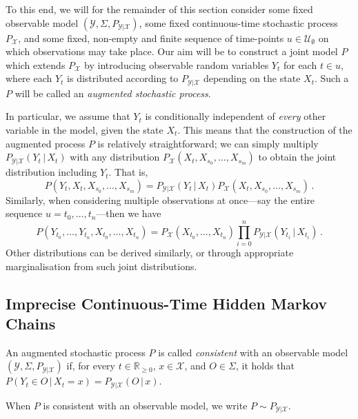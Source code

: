 \documentclass[twoside,11pt]{article}
\newcommand{\reals}{\mathbb{R}}
\newcommand{\realsnonneg}{\reals_{\geq 0}}
\newcommand{\states}{\mathcal{X}}
\newcommand{\observs}{\mathcal{Y}}
\begin{document}
To this end, we will for the remainder of this section consider some fixed observable model $(\observs,\Sigma,P_{\observs\vert\states})$, some fixed continuous-time stochastic process $P_\states$, and some fixed, non-empty and finite sequence of time-points $u\in\mathcal{U}_{\emptyset}$ on which observations may take place. Our aim will be to construct a joint model $P$ which extends $P_\states$ by introducing observable random variables $Y_t$ for each $t\in u$, where each $Y_t$ is distributed according to $P_{\observs\vert\states}$ depending on the state $X_t$. Such a $P$ will be called an \emph{augmented stochastic process}.

In particular, we assume that $Y_t$ is conditionally independent of \emph{every} other variable in the model, given the state $X_t$. This means that the construction of the augmented process $P$ is relatively straightforward; we can simply multiply $P_{\observs\vert\states}(Y_t\,\vert\,X_t)$ with any distribution $P_\states(X_t,X_{s_0},\ldots,X_{s_m})$ to obtain the joint distribution including $Y_t$. That is,
\begin{equation*}
P(Y_t,X_t,X_{s_0},\ldots,X_{s_m}) = P_{\observs\vert\states}(Y_t\,\vert\,X_t)P_\states(X_t,X_{s_0},\ldots,X_{s_m})\,.
\end{equation*}
Similarly, when considering multiple observations at once---say the entire sequence $u=t_0,\ldots,t_n$---then we have
\begin{equation*}
P(Y_{t_0},\ldots,Y_{t_n},X_{t_0},\ldots,X_{t_n}) = P_\states(X_{t_0},\ldots,X_{t_n})\prod_{i=0}^n P_{\observs\vert\states}(Y_{t_i}\,\vert\,X_{t_i})\,.
\end{equation*}
Other distributions can be derived similarly, or through appropriate marginalisation from such joint distributions.

\subsection{Imprecise Continuous-Time Hidden Markov Chains}

\begin{definition}
An augmented stochastic process $P$ is called \emph{consistent} with an observable model $(\observs,\Sigma,P_{\observs\vert\states})$ if, for every $t\in\realsnonneg$, $x\in\states$, and $O\in\Sigma$, it holds that $P(Y_t\in O\,\vert\,X_t=x)=P_{\observs\vert\states}(O\,\vert\,x)$.

When $P$ is consistent with an observable model, we write $P\sim P_{\observs\vert\states}$.
\end{definition}
\end{document}
